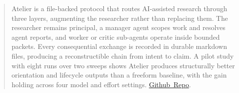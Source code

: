 \begin{abstract}
  Atelier is a file-backed protocol that routes AI-assisted research through three layers, augmenting the researcher rather than replacing them. The researcher remains principal, a manager agent scopes work and resolves agent reports, and worker or critic sub-agents operate inside bounded packets. Every consequential exchange is recorded in durable markdown files, producing a reconstructible chain from intent to claim. A pilot study with eight runs over two sweeps shows Atelier produces structurally better orientation and lifecycle outputs than a freeform baseline, with the gain holding across four model and effort settings. \mbox{\href{https://github.com/Yuchong-Geng/atelier}{Github Repo}}.
\end{abstract}
